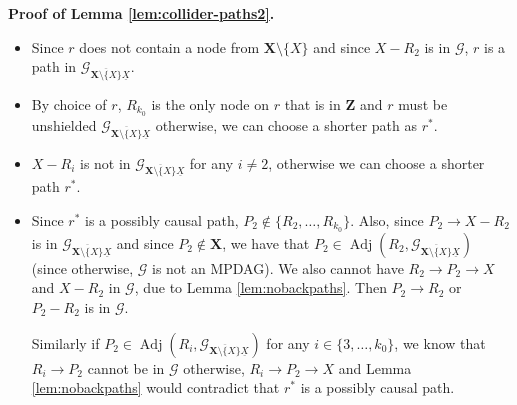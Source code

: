 \documentclass[11pt]{article}
\DeclareMathOperator{\Adj}{Adj}
\newcommand{\mb}[1]{\mathbf{#1}}
\newcommand{\g}[1][G]{\mathcal{#1}}
\newenvironment{proofofnoqed}[1][]{\noindent \textbf{Proof of #1.}}{}
\begin{document}
\begin{proofofnoqed}[Lemma \ref{lem:collider-paths2}]
    \begin{itemize}
        \item[\ref{rprop0}]
        Since $r$ does not contain a node from $\mb{X}\setminus \{X\}$ and since $X - R_2$ is in $\g$, $r$ is a path in $\g_{\overline{\mb{X} \setminus \{X\}} \underline{X}}$.
    
        \item[\ref{rprop1}]
        By choice of $r$, $R_{k_0}$ is the only node on $r$ that is in $\mb{Z}$ and $r$ must be unshielded $\g_{\overline{\mb{X} \setminus \{X\}} \underline{X}}$ otherwise, we can choose a shorter path as $r^{*}$. 

        \item[\ref{rprop2}]
        $X - R_i$ is not in $\g_{\overline{\mb{X} \setminus \{X\}} \underline{X}}$ for any $i \neq 2$, otherwise we can choose a shorter path $r^{*}$.

        \item[\ref{rprop3}]
        Since $r^{*}$ is a possibly causal path, $P_2 \notin \{R_2, \dots, R_{k_0}\}$. Also, since $P_2 \to X- R_2$ is in $\g_{\overline{\mb{X} \setminus \{X\}} \underline{X}}$ and since $P_2 \notin \mb{X}$, we have that $P_2 \in \Adj(R_2, \g_{\overline{\mb{X} \setminus \{X\}} \underline{X}})$ (since otherwise, $\g$ is not an MPDAG). We also cannot have $R_2 \to P_2 \to X$ and $X - R_2$ in $\g$, due to Lemma \ref{lem:nobackpaths}. Then $P_2 \to R_2$ or $P_2 - R_2$ is in $\g$.

        Similarly if $P_2 \in \Adj(R_i, \g_{\overline{\mb{X} \setminus \{X\}} \underline{X}})$ for any $i \in \{3, \dots, k_0\}$, we know that $R_i \to P_2$ cannot be in $\g$ otherwise, $R_i \to P_2 \to X$ and Lemma \ref{lem:nobackpaths} would contradict that $r^{*}$ is a possibly causal path.


\end{itemize}
\end{proofofnoqed}
\end{document}
